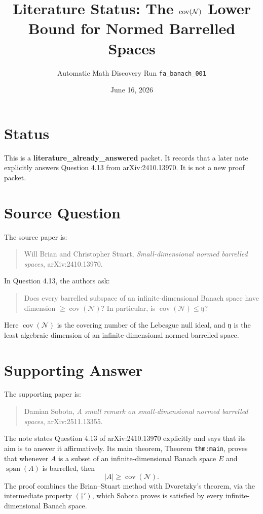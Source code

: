 \documentclass[11pt]{article}
\title{Literature Status: The \(\covN\) Lower Bound for Normed Barrelled Spaces}
\author{Automatic Math Discovery Run \texttt{fa\_banach\_001}}
\date{June 16, 2026}
\newcommand{\covN}{\operatorname{cov}(\mathcal N)}
\newcommand{\yfrak}{\mathfrak y}
\newcommand{\spanop}{\operatorname{span}}
\begin{document}
\sloppy
\maketitle

\section*{Status}

This is a \textbf{literature\_already\_answered} packet.  It records that a
later note explicitly answers Question 4.13 from arXiv:2410.13970.  It is not
a new proof packet.

\section*{Source Question}

The source paper is:

\begin{quote}
Will Brian and Christopher Stuart,
\emph{Small-dimensional normed barrelled spaces}, arXiv:2410.13970.
\end{quote}

In Question 4.13, the authors ask:

\begin{quote}
Does every barrelled subspace of an infinite-dimensional Banach space have
dimension \(\geq \covN\)?  In particular, is \(\covN \leq \yfrak\)?
\end{quote}

Here \(\covN\) is the covering number of the Lebesgue null ideal, and
\(\yfrak\) is the least algebraic dimension of an infinite-dimensional normed
barrelled space.

\section*{Supporting Answer}

The supporting paper is:

\begin{quote}
Damian Sobota,
\emph{A small remark on small-dimensional normed barrelled spaces},
arXiv:2511.13355.
\end{quote}

The note states Question 4.13 of arXiv:2410.13970 explicitly and says that its
aim is to answer it affirmatively.  Its main theorem, Theorem
\texttt{thm:main}, proves that whenever \(A\) is a subset of an
infinite-dimensional Banach space \(E\) and \(\spanop(A)\) is barrelled, then
\[
  |A| \geq \covN.
\]
The proof combines the Brian--Stuart method with Dvoretzky's theorem, via the
intermediate property \((\dagger')\), which Sobota proves is satisfied by every
infinite-dimensional Banach space.
\end{document}
